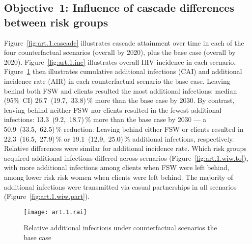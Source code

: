 \subsection{Objective~1: Influence of cascade differences between risk groups}\label{art.res.1}
Figure~\ref{fig:art.1.cascade} illustrates cascade attainment over time
in each of the four counterfactual scenarios (\casmd overall by 2020),
plus the base case (\cashi overall by 2020).
Figure~\ref{fig:art.1.inc} illustrates overall HIV incidence in each scenario.
Figure~\ref{fig:art.1.rai} then illustrates
cumulative additional infections (CAI) and additional incidence rate (AIR)
in each counterfactual scenario \vs the base case.
Leaving behind both FSW and clients resulted the most additional infections: median (95\%~CI)
26.7~(19.7,~33.8)\,\% more than the base case by 2030. %
By contrast, leaving behind neither FSW nor clients resulted in the fewest additional infections:
13.3~(9.2,~18.7)\,\% more than the base case by 2030 --- %
a 50.9~(33.5,~62.5)\,\% reduction. %
Leaving behind either FSW or clients resulted in
22.3~(16.5,~27.9)\,\% or 19.1~(12.9,~25.0)\,\% additional infections, respectively. %
Relative differences were similar for additional incidence rate.
Which risk groups acquired additional infections differed across scenarios
(Figure~\ref{fig:art.1.wiw.to}),
with more additional infections among clients when FSW were left behind,
\vs among lower risk risk women when clients were left behind.
The majority of additional infections were transmitted
via casual partnerships in all scenarios (Figure~\ref{fig:art.1.wiw.part}). %
\begin{figure}[h]
  \centering\texttt{[image: art.1.rai]}
  \caption{Relative additional infections under counterfactual scenarios \vs the base case}
  \label{fig:art.1.rai}
\end{figure}
